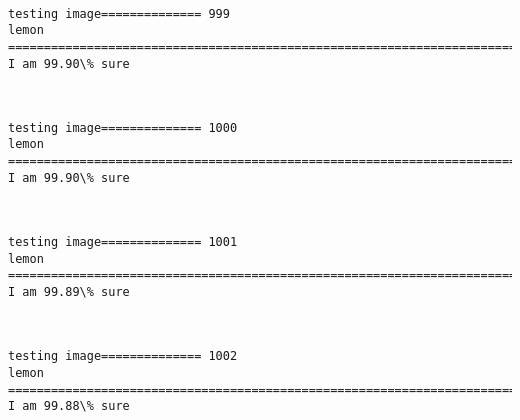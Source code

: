 \documentclass[11pt]{article}
\begin{document}
    \begin{center}
    \end{center}
    { \hspace*{\fill} \\}
    
    \begin{Verbatim}[commandchars=\\\{\}]
testing image============== 999
lemon
============================================================================
I am 99.90\% sure

    \end{Verbatim}

    \begin{center}
    \end{center}
    { \hspace*{\fill} \\}
    
    \begin{Verbatim}[commandchars=\\\{\}]
testing image============== 1000
lemon
============================================================================
I am 99.90\% sure

    \end{Verbatim}

    \begin{center}
    \end{center}
    { \hspace*{\fill} \\}
    
    \begin{Verbatim}[commandchars=\\\{\}]
testing image============== 1001
lemon
============================================================================
I am 99.89\% sure

    \end{Verbatim}

    \begin{center}
    \end{center}
    { \hspace*{\fill} \\}
    
    \begin{Verbatim}[commandchars=\\\{\}]
testing image============== 1002
lemon
============================================================================
I am 99.88\% sure

    \end{Verbatim}
\end{document}
